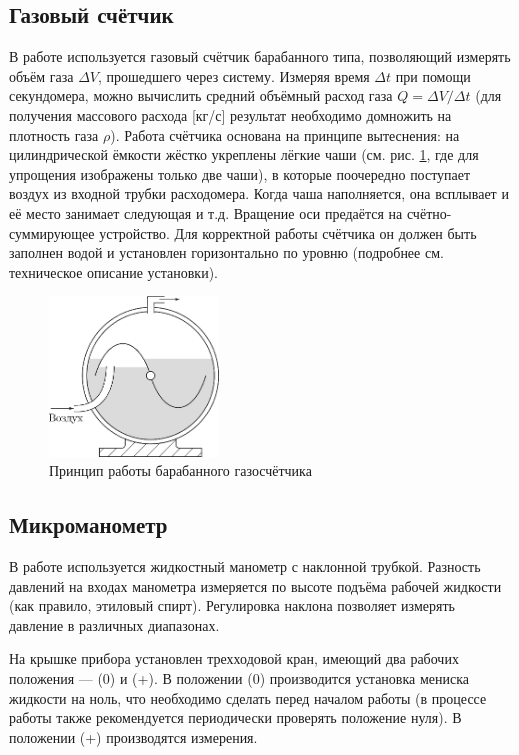 \documentclass[a4paper,12pt]{article} %
\begin{document}
\subsection*{Газовый счётчик}

В работе используется газовый счётчик барабанного
типа, позволяющий измерять объём газа $\Delta V$, прошедшего через систему. Измеряя время $\Delta t$ при помощи секундомера, можно вычислить средний объёмный расход газа $Q = \Delta V / \Delta t$ (для получения массового расхода [кг/с] результат
необходимо домножить на плотность газа $\rho$).
Работа счётчика основана на принципе вытеснения: на цилиндрической ёмкости жёстко
укреплены лёгкие чаши (см. рис. \ref{газосчетчик}, где для
упрощения изображены только две чаши), в которые поочередно поступает воздух из входной
трубки расходомера. Когда чаша наполняется,
она всплывает и её место занимает следующая
и т.д. Вращение оси предаётся на счётно-суммирующее устройство.
Для корректной работы счётчика он должен
быть заполнен водой и установлен горизонтально по уровню (подробнее см. техническое
описание установки).

\begin{figure}[h!]
    \centering
    \includegraphics[width=0.4\textwidth]{газосчетчик.png}
    \caption{Принцип работы барабанного газосчётчика}\label{газосчетчик}
\end{figure}

\newpage

\subsection*{Микроманометр}

В работе используется жидкостный манометр с наклонной трубкой. Разность давлений на входах манометра измеряется по высоте
подъёма рабочей жидкости (как правило, этиловый спирт). Регулировка
наклона позволяет измерять давление в различных диапазонах.

На крышке прибора установлен трехходовой кран, имеющий два рабочих
положения — (0) и (+). В положении (0) производится установка мениска жидкости на ноль, что необходимо сделать перед началом работы (в процессе работы также рекомендуется периодически проверять положение нуля). В положении (+) производятся измерения.
\end{document}
